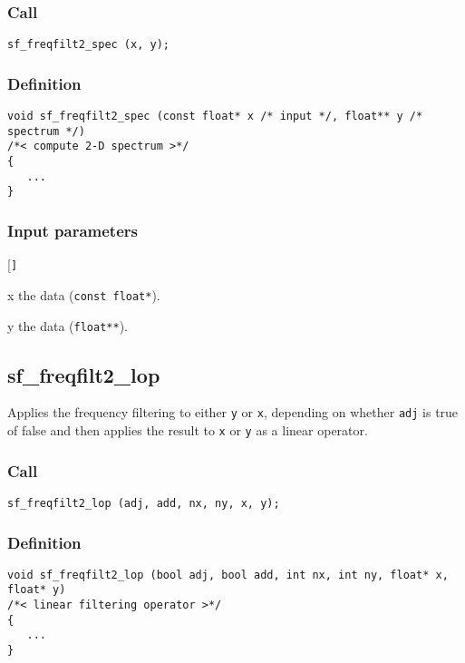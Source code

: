 \subsubsection*{Call}
\begin{verbatim}sf_freqfilt2_spec (x, y);\end{verbatim}

\subsubsection*{Definition}
\begin{verbatim}
void sf_freqfilt2_spec (const float* x /* input */, float** y /* spectrum */) 
/*< compute 2-D spectrum >*/
{
   ...
}
\end{verbatim}

\subsubsection*{Input parameters}
\begin{desclist}{\tt }{\quad}[\tt ]
   \setlength\itemsep{0pt}
   \item[x] the data (\texttt{const float*}).  
   \item[y] the data (\texttt{float**}).  
\end{desclist}




\subsection{{sf\_freqfilt2\_lop}}
Applies the frequency filtering to either \texttt{y} or \texttt{x}, depending on whether \texttt{adj} is true of false and then applies the result to \texttt{x} or \texttt{y} as a linear operator.


\subsubsection*{Call}
\begin{verbatim}sf_freqfilt2_lop (adj, add, nx, ny, x, y);\end{verbatim}

\subsubsection*{Definition}
\begin{verbatim}
void sf_freqfilt2_lop (bool adj, bool add, int nx, int ny, float* x, float* y) 
/*< linear filtering operator >*/
{
   ...
}
\end{verbatim}

